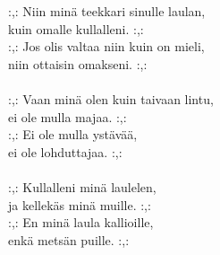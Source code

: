
:,: Niin minä teekkari sinulle laulan, \\ kuin omalle kullalleni. :,: \\ :,: Jos olis valtaa niin kuin on mieli, \\ niin ottaisin omakseni. :,: \\ \hspace{10mm} \\ :,: Vaan minä olen kuin taivaan lintu, \\ ei ole mulla majaa. :,: \\ :,: Ei ole mulla ystävää, \\ ei ole lohduttajaa. :,: \\ \hspace{10mm} \\ :,: Kullalleni minä laulelen, \\ ja kellekäs minä muille. :,: \\ :,: En minä laula kallioille, \\ enkä metsän puille. :,: